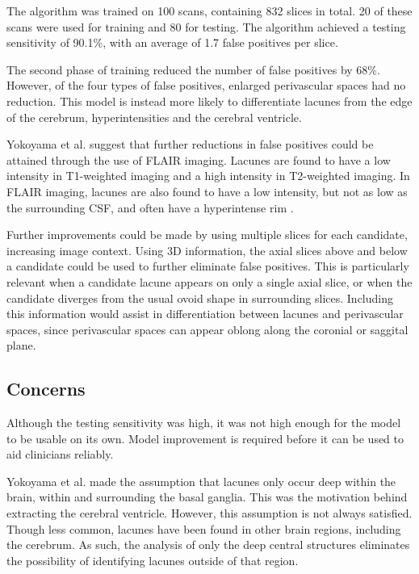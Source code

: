 The algorithm was trained on 100 scans, containing 832 slices in total. 20 of these scans were used for training and 80 for testing. The algorithm achieved a testing sensitivity of 90.1\%, with an average of 1.7 false positives per slice.

The second phase of training reduced the number of false positives by 68\%. However, of the four types of false positives, enlarged perivascular spaces had no reduction. This model is instead more likely to differentiate lacunes from the edge of the cerebrum, hyperintensities and the cerebral ventricle.

Yokoyama et al. suggest that further reductions in false positives could be attained through the use of FLAIR imaging. Lacunes are found to have a low intensity in T1-weighted imaging and a high intensity in T2-weighted imaging. In FLAIR imaging, lacunes are also found to have a low intensity, but not as low as the surrounding CSF, and often have a hyperintense rim \cite{WardlawJ.M.2013Nsfr}. 

Further improvements could be made by using multiple slices for each candidate, increasing image context. Using 3D information, the axial slices above and below a candidate could be used to further eliminate false positives. This is particularly relevant when a candidate lacune appears on only a single axial slice, or when the candidate diverges from the usual ovoid shape in surrounding slices. Including this information would assist in differentiation between lacunes and perivascular spaces, since perivascular spaces can appear oblong along the coronial or saggital plane.

\subsection*{Concerns}

Although the testing sensitivity was high, it was not high enough for the model to be usable on its own. Model improvement is required before it can be used to aid clinicians reliably.

Yokoyama et al. made the assumption that lacunes only occur deep within the brain, within and surrounding the basal ganglia. This was the motivation behind extracting the cerebral ventricle. However, this assumption is not always satisfied. Though less common, lacunes have been found in other brain regions, including the cerebrum. As such, the analysis of only the deep central structures eliminates the possibility of identifying lacunes outside of that region.

